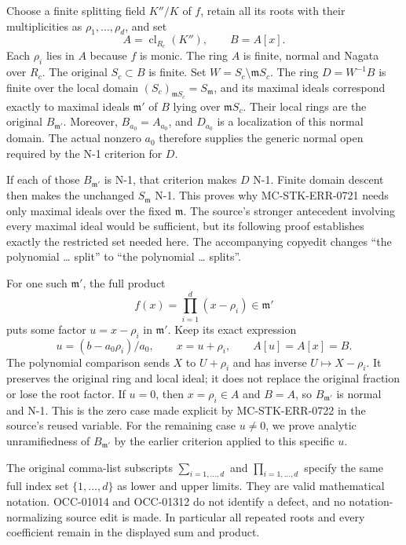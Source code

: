 Choose a finite splitting field \(K''/K\) of \(f\), retain all its roots with their multiplicities as \(\rho_1,\ldots,\rho_d\), and set \[
 A=\operatorname{cl}_{R_c}(K''),\qquad B=A[x].
\] Each \(\rho_i\) lies in \(A\) because \(f\) is monic. The ring \(A\) is finite, normal and Nagata over \(R_c\). The original \(S_c\subset B\) is finite. Set \(W=S_c\setminus\mathfrak mS_c\). The ring \(D=W^{-1}B\) is finite over the local domain \((S_c)_{\mathfrak mS_c}=S_{\mathfrak m}\), and its maximal ideals correspond exactly to maximal ideals \(\mathfrak m'\) of \(B\) lying over \(\mathfrak mS_c\). Their local rings are the original \(B_{\mathfrak m'}\). Moreover, \(B_{a_0}=A_{a_0}\), and \(D_{a_0}\) is a localization of this normal domain. The actual nonzero \(a_0\) therefore supplies the generic normal open required by the N-1 criterion for \(D\).

If each of those \(B_{\mathfrak m'}\) is N-1, that criterion makes \(D\) N-1. Finite domain descent then makes the unchanged \(S_{\mathfrak m}\) N-1. This proves why MC-\AlgebraIdentifierBreak{}STK-\AlgebraIdentifierBreak{}ERR-\AlgebraIdentifierBreak{}0721 needs only maximal ideals over the fixed \(\mathfrak m\). The source's stronger antecedent involving every maximal ideal would be sufficient, but its following proof establishes exactly the restricted set needed here. The accompanying copyedit changes ``the polynomial \ldots{} split'' to ``the polynomial \ldots{} splits''.

For one such \(\mathfrak m'\), the full product \[
 f(x)=\prod_{i=1}^{d}(x-\rho_i)\in\mathfrak m'
\] puts some factor \(u=x-\rho_i\) in \(\mathfrak m'\). Keep its exact expression \[
 u=(b-a_0\rho_i)/a_0,\qquad x=u+\rho_i,
 \qquad A[u]=A[x]=B.
\] The polynomial comparison sends \(X\) to \(U+\rho_i\) and has inverse \(U\mapsto X-\rho_i\). It preserves the original ring and local ideal; it does not replace the original fraction or lose the root factor. If \(u=0\), then \(x=\rho_i\in A\) and \(B=A\), so \(B_{\mathfrak m'}\) is normal and N-1. This is the zero case made explicit by MC-\AlgebraIdentifierBreak{}STK-\AlgebraIdentifierBreak{}ERR-\AlgebraIdentifierBreak{}0722 in the source's reused variable. For the remaining case \(u\ne0\), we prove analytic unramifiedness of \(B_{\mathfrak m'}\) by the earlier criterion applied to this specific \(u\).

The original comma-list subscripts \(\sum_{i=1,\ldots,d}\) and \(\prod_{i=1,\ldots,d}\) specify the same full index set \(\{1,\ldots,d\}\) as lower and upper limits. They are valid mathematical notation. OCC-01014 and OCC-01312 do not identify a defect, and no notation-normalizing source edit is made. In particular all repeated roots and every coefficient remain in the displayed sum and product.

